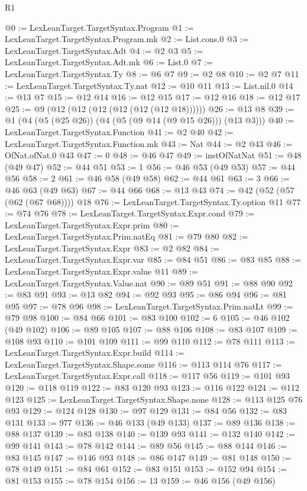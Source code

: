 \begin{lexlean}{R1}
\begin{coremodule}
@0 := LexLeanTarget.TargetSyntax.Program
@1 := LexLeanTarget.TargetSyntax.Program.mk
@2 := List.cons.{0}
@3 := LexLeanTarget.TargetSyntax.Adt
@4 := @2 @3
@5 := LexLeanTarget.TargetSyntax.Adt.mk
@6 := List.{0}
@7 := LexLeanTarget.TargetSyntax.Ty
@8 := @6 @7
@9 := @2 @8
@10 := @2 @7
@11 := LexLeanTarget.TargetSyntax.Ty.nat
@12 := @10 @11
@13 := List.nil.{0}
@14 := @13 @7
@15 := @12 @14
@16 := @12 @15
@17 := @12 @16
@18 := @12 @17
@25 := @9 (@12 (@12 (@12 (@12 (@12 (@12 @18))))))
@26 := @13 @8
@39 := @1 (@4 (@5 (@25 @26)) (@4 (@5 (@9 @14 (@9 @15 @26))) (@13 @3)))
@40 := LexLeanTarget.TargetSyntax.Function
@41 := @2 @40
@42 := LexLeanTarget.TargetSyntax.Function.mk
@43 := Nat
@44 := @2 @43
@46 := OfNat.ofNat.{0} @43
@47 := 0
@48 := @46 @47
@49 := instOfNatNat
@51 := @48 (@49 @47)
@52 := @44 @51
@53 := 1
@56 := @46 @53 (@49 @53)
@57 := @44 @56
@58 := 2
@61 := @46 @58 (@49 @58)
@62 := @44 @61
@63 := 3
@66 := @46 @63 (@49 @63)
@67 := @44 @66
@68 := @13 @43
@74 := @42 (@52 (@57 (@62 (@67 @68)))) @18
@76 := LexLeanTarget.TargetSyntax.Ty.option @11
@77 := @74 @76
@78 := LexLeanTarget.TargetSyntax.Expr.cond
@79 := LexLeanTarget.TargetSyntax.Expr.prim
@80 := LexLeanTarget.TargetSyntax.Prim.natEq
@81 := @79 @80
@82 := LexLeanTarget.TargetSyntax.Expr
@83 := @2 @82
@84 := LexLeanTarget.TargetSyntax.Expr.var
@85 := @84 @51
@86 := @83 @85
@88 := LexLeanTarget.TargetSyntax.Expr.value @11
@89 := LexLeanTarget.TargetSyntax.Value.nat
@90 := @89 @51
@91 := @88 @90
@92 := @83 @91
@93 := @13 @82
@94 := @92 @93
@95 := @86 @94
@96 := @81 @95
@97 := @78 @96
@98 := LexLeanTarget.TargetSyntax.Prim.natLt
@99 := @79 @98
@100 := @84 @66
@101 := @83 @100
@102 := 6
@105 := @46 @102 (@49 @102)
@106 := @89 @105
@107 := @88 @106
@108 := @83 @107
@109 := @108 @93
@110 := @101 @109
@111 := @99 @110
@112 := @78 @111
@113 := LexLeanTarget.TargetSyntax.Expr.build
@114 := LexLeanTarget.TargetSyntax.Shape.some
@116 := @113 @114 @76
@117 := LexLeanTarget.TargetSyntax.Expr.call
@118 := @117 @56
@119 := @101 @93
@120 := @118 @119
@122 := @83 @120 @93
@123 := @116 @122
@124 := @112 @123
@125 := LexLeanTarget.TargetSyntax.Shape.none
@128 := @113 @125 @76 @93
@129 := @124 @128
@130 := @97 @129
@131 := @84 @56
@132 := @83 @131
@133 := 977
@136 := @46 @133 (@49 @133)
@137 := @89 @136
@138 := @88 @137
@139 := @83 @138
@140 := @139 @93
@141 := @132 @140
@142 := @99 @141
@143 := @78 @142
@144 := @89 @56
@145 := @88 @144
@146 := @83 @145
@147 := @146 @93
@148 := @86 @147
@149 := @81 @148
@150 := @78 @149
@151 := @84 @61
@152 := @83 @151
@153 := @152 @94
@154 := @81 @153
@155 := @78 @154
@156 := 13
@159 := @46 @156 (@49 @156)

\end{coremodule}
\end{lexlean}
